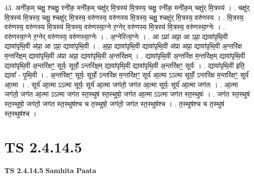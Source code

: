 \documentclass[17pt]{extarticle}
\begin{document}
43. अनी॑क॒म् चक्षु॒ श्चक्षु॒ रनी॑क॒ मनी॑क॒म् चक्षु॑र् मि॒त्रस्य॑ मि॒त्रस्य॒ चक्षु॒ रनी॑क॒ मनी॑क॒म् चक्षु॑र् मि॒त्रस्य॑ । . चक्षु॑र् मि॒त्रस्य॑ मि॒त्रस्य॒ चक्षु॒ श्चक्षु॑र् मि॒त्रस्य॒ वरु॑णस्य॒ वरु॑णस्य मि॒त्रस्य॒ चक्षु॒ श्चक्षु॑र् मि॒त्रस्य॒ वरु॑णस्य । . मि॒त्रस्य॒ वरु॑णस्य॒ वरु॑णस्य मि॒त्रस्य॑ मि॒त्रस्य॒ वरु॑णस्या॒ग्ने र॒ग्नेर् वरु॑णस्य मि॒त्रस्य॑ मि॒त्रस्य॒ वरु॑णस्या॒ग्नेः । . वरु॑णस्या॒ग्ने र॒ग्नेर् वरु॑णस्य॒ वरु॑णस्या॒ग्नेः । . अ॒ग्नेरित्य॒ग्नेः । . आ ऽप्रा॑ अप्रा॒ आ ऽप्रा॒ द्यावा॑पृथि॒वी द्यावा॑पृथि॒वी अ॑प्रा॒ आ ऽप्रा॒ द्यावा॑पृथि॒वी । . अ॒प्रा॒ द्यावा॑पृथि॒वी द्यावा॑पृथि॒वी अ॑प्रा अप्रा॒ द्यावा॑पृथि॒वी अ॒न्तरि॑क्ष म॒न्तरि॑क्ष॒म् द्यावा॑पृथि॒वी अ॑प्रा अप्रा॒ द्यावा॑पृथि॒वी अ॒न्तरि॑क्षम् । . द्यावा॑पृथि॒वी अ॒न्तरि॑क्ष म॒न्तरि॑क्ष॒म् द्यावा॑पृथि॒वी द्यावा॑पृथि॒वी अ॒न्तरि॑क्षꣳ॒॒ सूर्यः॒ सूर्यो॒ ऽन्तरि॑क्ष॒म् द्यावा॑पृथि॒वी द्यावा॑पृथि॒वी अ॒न्तरि॑क्षꣳ॒॒ सूर्यः॑ । . द्यावा॑पृथि॒वी इति॒ द्यावा᳚ - पृ॒थि॒वी । . अ॒न्तरि॑क्षꣳ॒॒ सूर्यः॒ सूर्यो॒ ऽन्तरि॑क्ष म॒न्तरि॑क्षꣳ॒॒ सूर्य॑ आ॒त्मा ऽऽत्मा सूर्यो॒ ऽन्तरि॑क्ष म॒न्तरि॑क्षꣳ॒॒ सूर्य॑ आ॒त्मा । . सूर्य॑ आ॒त्मा ऽऽत्मा सूर्यः॒ सूर्य॑ आ॒त्मा जग॑तो॒ जग॑त आ॒त्मा सूर्यः॒ सूर्य॑ आ॒त्मा जग॑तः । . आ॒त्मा जग॑तो॒ जग॑त आ॒त्मा ऽऽत्मा जग॑त स्त॒स्थुष॑ स्त॒स्थुषो॒ जग॑त आ॒त्मा ऽऽत्मा जग॑त स्त॒स्थुषः॑ । . जग॑त स्त॒स्थुष॑ स्त॒स्थुषो॒ जग॑तो॒ जग॑त स्त॒स्थुष॑श्च च त॒स्थुषो॒ जग॑तो॒ जग॑त स्त॒स्थुष॑श्च । . त॒स्थुष॑श्च च त॒स्थुष॑ स्त॒स्थुष॑श्च । \newline
\pagebreak
{}
\section*{ TS 2.4.14.5 }

\textbf{TS 2.4.14.5 } \newline
\textbf{Samhita Paata} \newline
\end{document}
